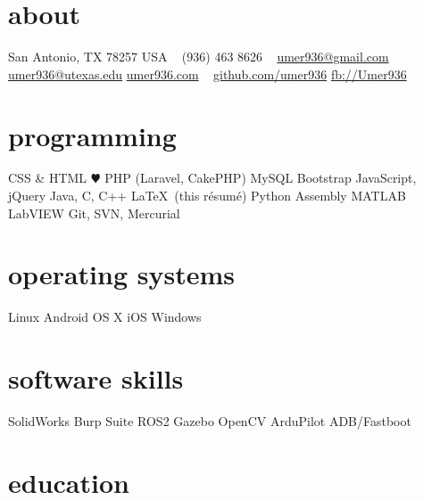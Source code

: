\documentclass[]{friggeri-cv} %
\begin{document}


\begin{aside} %
	\section{about}
	San Antonio, TX 78257
	USA
	~
	(936) 463 8626
	~
	\href{mailto:umer936@gmail.com}{umer936@gmail.com}
	\href{mailto:umer936@utexas.edu}{umer936@utexas.edu}
	\href{http://umer936.com}{umer936.com}
	~
	\href{http://github.com/umer936}{github.com/umer936}
	\href{http://facebook.com/Umer936}{fb://Umer936}
	~
	\section{programming}
	CSS \& HTML
	{\color{red} $\varheartsuit$} PHP (Laravel, CakePHP)
	MySQL
	Bootstrap
	JavaScript, jQuery
	Java, C, C++
	\LaTeX \ (this r\'esum\'e)
	Python
	Assembly
	MATLAB
	LabVIEW
	Git, SVN, Mercurial
	~
	\section{operating systems}
	Linux
	Android
	OS X
	iOS
	Windows
	~
	\section{software skills}
	SolidWorks
	Burp Suite
	ROS2
	Gazebo
	OpenCV
	ArduPilot
	ADB/Fastboot
\end{aside}


\section{education}
\vspace{-10pt}
\end{document}
